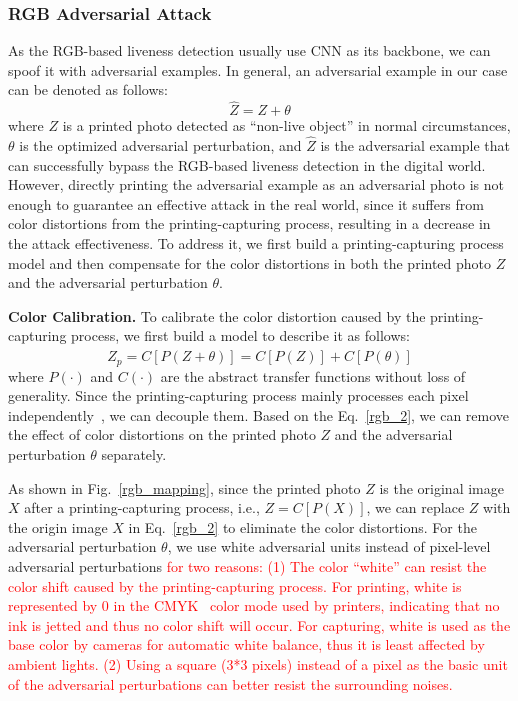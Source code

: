 \subsubsection{RGB Adversarial Attack}
As the RGB-based liveness detection usually use CNN as its backbone, we can spoof it with adversarial examples. In general, an adversarial example in our case can be denoted as follows: 
\begin{equation}
	\widehat{Z} = Z+\theta \label{rgb_1}
\end{equation}
where $Z$ is a printed photo detected as ``non-live object''  in normal circumstances,  $\theta$ is the optimized adversarial perturbation, and  $\widehat{Z}$ is the adversarial example that can successfully bypass the RGB-based liveness detection in the digital world. However, directly printing the adversarial example as
 an adversarial photo is not enough to guarantee an effective
 attack in the real world, since it suffers from color distortions
 from the printing-capturing process, resulting in a decrease
in the attack effectiveness.  To address it, we first build a printing-capturing
process model and then compensate for the color distortions
in both the printed photo $Z$ and the adversarial perturbation $\theta$.

\textbf{Color Calibration.}
To calibrate the color distortion caused by the printing-capturing process, we first build a model to describe it as follows:
\begin{equation}
	\widehat{Z}_p=C[P(Z+\theta)] =C[P(Z)]+C[P(\theta)]\label{rgb_2}
\end{equation}
where $P(\cdot)$ and $C(\cdot)$ are the abstract transfer functions without loss of generality. Since the printing-capturing process mainly processes each pixel independently~\cite{yin2013image}, we can decouple them. Based on the Eq.~\ref{rgb_2}, we can remove the effect of color distortions on the printed photo $Z$ and the adversarial perturbation $\theta$ separately.

As shown in Fig.~\ref{rgb_mapping}, since the printed photo $Z$ is the original image $X$ after a printing-capturing process, i.e., $Z=C[P(X)]$, we can replace $Z$ with the origin image $X$ in Eq.~\ref{rgb_2} to eliminate the color distortions. For the adversarial perturbation $\theta$, we use white adversarial units instead of pixel-level adversarial perturbations \textcolor{red}{for two reasons: (1) The color “white” can resist the color shift caused by the printing-capturing process. For printing, white is represented by 0 in the CMYK~\cite{yin2013image} color mode used by printers, indicating that no ink is jetted and thus no color shift will occur. For capturing, white is used as the base color by cameras for automatic white balance, thus it is least affected by ambient lights. (2) Using a square (3*3 pixels) instead of a pixel as the basic unit of the adversarial perturbations can better resist the surrounding noises.}

